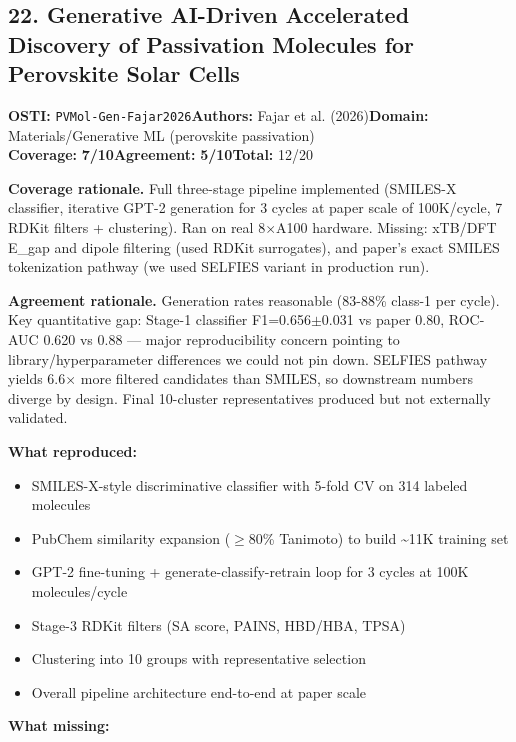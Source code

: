 \documentclass[11pt]{article}
\newcommand{\scorebadge}[2]{\textbf{#1:} \textbf{#2/10}}
\begin{document}
\subsection{22. Generative AI-Driven Accelerated Discovery of Passivation Molecules for Perovskite Solar Cells}
\textbf{OSTI:} \texttt{PVMol-Gen-Fajar2026}\quad\textbf{Authors:} Fajar et al. (2026)\quad\textbf{Domain:} Materials/Generative ML (perovskite passivation)\\
\scorebadge{Coverage}{7}\quad\scorebadge{Agreement}{5}\quad\textbf{Total:} 12/20\par\smallskip
\noindent\textbf{Coverage rationale.} Full three-stage pipeline implemented (SMILES-X classifier, iterative GPT-2 generation for 3 cycles at paper scale of 100K/cycle, 7 RDKit filters + clustering). Ran on real 8$\times$A100 hardware. Missing: xTB/DFT E\_gap and dipole filtering (used RDKit surrogates), and paper's exact SMILES tokenization pathway (we used SELFIES variant in production run).\par
\noindent\textbf{Agreement rationale.} Generation rates reasonable (83-88\% class-1 per cycle). Key quantitative gap: Stage-1 classifier F1=0.656$\pm$0.031 vs paper 0.80, ROC-AUC 0.620 vs 0.88 --- major reproducibility concern pointing to library/hyperparameter differences we could not pin down. SELFIES pathway yields 6.6$\times$ more filtered candidates than SMILES, so downstream numbers diverge by design. Final 10-cluster representatives produced but not externally validated.\par\smallskip
\noindent\textbf{What reproduced:}
\begin{itemize}[leftmargin=1.4em,itemsep=0.2em,topsep=0.2em]
\item SMILES-X-style discriminative classifier with 5-fold CV on 314 labeled molecules
\item PubChem similarity expansion ($\geq$80\% Tanimoto) to build \textasciitilde{}11K training set
\item GPT-2 fine-tuning + generate-classify-retrain loop for 3 cycles at 100K molecules/cycle
\item Stage-3 RDKit filters (SA score, PAINS, HBD/HBA, TPSA)
\item Clustering into 10 groups with representative selection
\item Overall pipeline architecture end-to-end at paper scale
\end{itemize}\noindent\textbf{What missing:}
\end{document}
